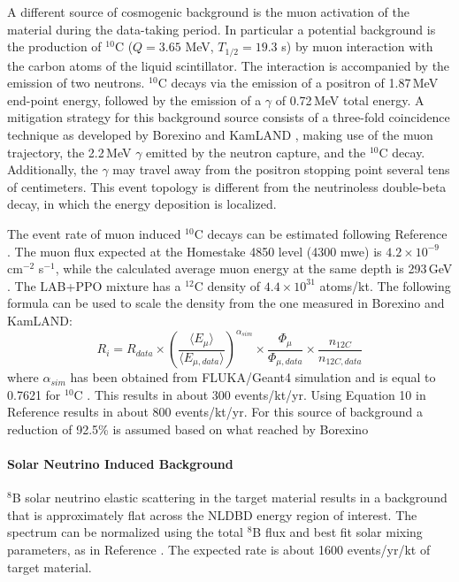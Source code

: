 A different source of cosmogenic background is the muon activation of the
material during the data-taking period. In particular a potential background
is the production of $^{10}$C ($Q=3.65$ MeV, $T_{1/2}=19.3$ s) by muon
interaction with the carbon atoms of the liquid scintillator. The interaction
is accompanied by the emission of two neutrons. $^{10}$C decays via the
emission of a positron of 1.87\,MeV end-point energy, followed by the
emission of a $\gamma$ of 0.72\,MeV total energy. A mitigation strategy for
this background source consists of a three-fold coincidence technique as
developed by Borexino and KamLAND \cite{galb05, gando16}, making use of the
muon trajectory, the 2.2\,MeV $\gamma$ emitted by the neutron capture, and
the $^{10}$C decay. Additionally, the $\gamma$ may travel away from the
positron stopping point several tens of centimeters. This event topology is
different from the neutrinoless double-beta decay, in which the energy
deposition is localized.

The event rate of muon induced $^{10}$C decays can be estimated following
Reference \cite{hagn00}. The muon flux expected at the Homestake 4850 level
(4300 mwe) is $4.2\times10^{-9}$ cm$^{-2}$ s$^{-1}$, while the calculated
average muon energy at the same depth is 293\,GeV \cite{mei06}. The
LAB+PPO mixture has a $^{12}$C density of $4.4\times 10^{31}$ atoms/kt.
The following formula can be used to scale the density from the one measured
in Borexino and KamLAND:
\begin{equation}
R_{i} = R_{data} \times 
{\left( \frac{\langle E_{\mu} \rangle}
             {\langle E_{\mu, data} \rangle} \right) }^{\alpha_{sim}} \times
\frac{\Phi_{\mu}}{\Phi_{\mu, data}} \times
\frac{n_{12C}}{n_{12C, data}}
\end{equation}
where $\alpha_{sim}$ has been obtained from FLUKA/Geant4 simulation and is
equal to 0.7621 for $^{10}$C \cite{zbiri10}. This results in about 300
events/kt/yr. Using Equation 10 in Reference \cite{hagn00} results in about
800 events/kt/yr. For this source of background a reduction of 92.5\% is assumed based on what reached by Borexino \cite{bxo2013}

\paragraph{Solar Neutrino Induced Background}
$^{8}$B solar neutrino elastic scattering in the target material results in
a background that is approximately flat across the NLDBD energy region of
interest. The spectrum can be normalized using the total $^{8}$B flux and
best fit solar mixing parameters, as in Reference \cite{SNO_3ph}. The expected
rate is about 1600 events/yr/kt of target material.\\

